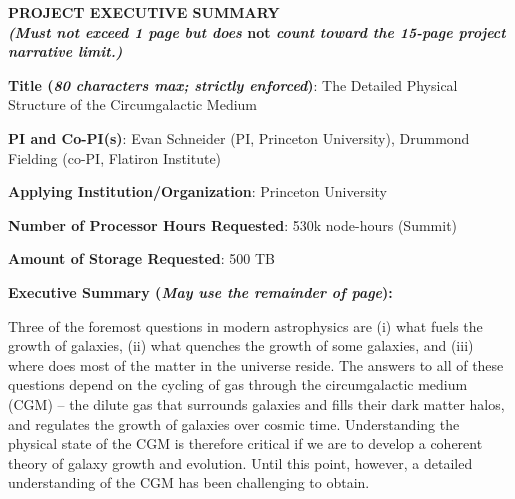 \documentclass[11pt,letterpaper,english]{article}
\begin{document}
\setlength{\parindent}{0in} %

\pagestyle{fancy}   \renewcommand{%
\headrulewidth}{0.0pt}

\begin{center}
\bf {PROJECT EXECUTIVE SUMMARY} \\
{\bf \small {\em (Must not exceed 1 page but does} not {\em count toward the 15-page project narrative limit.)}}
\end{center}


\bigskip

\textbf{Title (\emph{80 characters max; strictly enforced})}: The Detailed Physical Structure of the Circumgalactic Medium \smallskip

\textbf{PI and Co-PI(s)}: Evan Schneider (PI, Princeton University), Drummond Fielding (co-PI, Flatiron Institute) \smallskip

\textbf{Applying Institution/Organization}: Princeton University \smallskip

\textbf{Number of Processor Hours Requested}: 530k node-hours (Summit) \smallskip

\textbf{Amount of Storage Requested}: 500 TB \smallskip

\textbf{Executive Summary ({\emph{May use the remainder of page}}):} \\

\vspace{.15in}

Three of the foremost questions in modern astrophysics are (i) what fuels the growth of galaxies, (ii) what quenches the growth of some galaxies, and (iii) where does most of the matter in the universe reside. The answers to all of these questions depend on the cycling of gas through the circumgalactic medium (CGM) -- the dilute gas that surrounds galaxies and fills their dark matter halos, and regulates the growth of galaxies over cosmic time. Understanding the physical state of the CGM is therefore critical if we are to develop a coherent theory of galaxy growth and evolution. Until this point, however, a detailed understanding of the CGM has been challenging to obtain.
\vspace{.15in}
\end{document}
